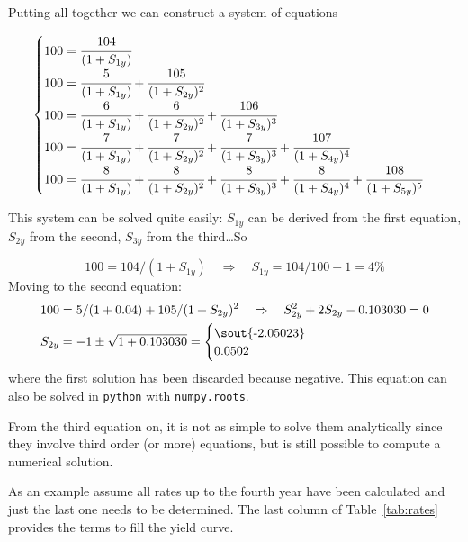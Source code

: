 Putting all together we can construct a system of equations

\begin{equation}
\begin{cases}
100 = \cfrac{104}{(1 + S_{1y})} \\
100 = \cfrac{5}{(1 + S_{1y})} + \cfrac{105}{(1 + S_{2y})^{2}} \\
100 = \cfrac{6} {(1 + S_{1y})} + \cfrac{6}{(1 + S_{2y})^{2}} + \cfrac{106} {(1 + S_{3y})^{3}} \\
100 = \cfrac{7} {(1 + S_{1y})} + \cfrac{7} {(1 + S_{2y})^{2}} + \cfrac{7} {(1 + S_{3y})^{3}} + \cfrac{107} {(1 + S_{4y})^{4}} \\
100 = \cfrac{8} {(1 + S_{1y})} + \cfrac{8} {(1 + S_{2y})^{2}}+ \cfrac{8} {(1 + S_{3y})^{3}} + \cfrac{8} {(1 + S_{4y})^{4}} + \cfrac{108} {(1 + S_{5y})^{5}}
\end{cases}
\label{eq:fifth_year_rate}
\end{equation}

This system can be solved quite easily: $S_{1y}$ can be derived from the first equation, $S_{2y}$ from the second, $S_{3y}$ from the third\ldots So

\begin{equation}
100 = 104 / (1 + S_{1y})\quad\Rightarrow\quad S_{1y} = 104/100 - 1 = 4\%
\end{equation}
Moving to the second equation:
\begin{equation}
\begin{split}
& 100 = 5 / (1 + 0.04) + 105 / (1 + S_{2y})^{2}\quad\Rightarrow\quad S_{2y}^2  + 2 S_{2y}  - 0.103030 = 0 \\
& S_{2y} = - 1 \pm \sqrt{1 + 0.103030} = \begin{cases}\text{\sout{-2.05023}} \\ 0.0502\end{cases}
\end{split}
\end{equation}
where the first solution has been discarded because negative. This equation can also be solved in \texttt{python} with \texttt{numpy.roots}.

From the third equation on, it is not as simple to solve them analytically since they involve third order (or more) equations, but is still possible to compute a numerical solution.

As an example assume all rates up to the fourth year have been calculated and just the last one needs to be determined. The last column of Table~\ref{tab:rates} provides the terms to fill the yield curve.

